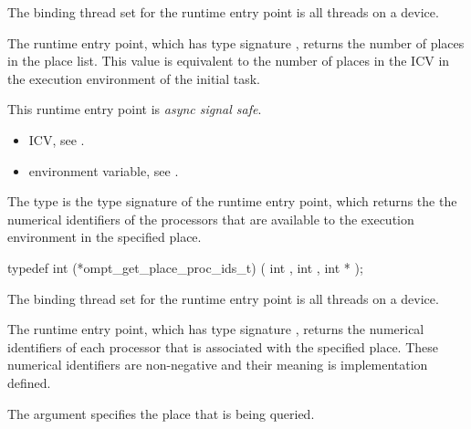 \binding
The binding thread set for the  runtime entry 
point is all threads on a device.

\descr
The  runtime entry point, which has type signature 
, returns the number of places in the place list. 
This value is equivalent to the number of places in the  
ICV in the execution environment of the initial task.

This runtime entry point is \emph{async signal safe}.

\crossreferences
\begin{itemize}
\item {} ICV, see
.

\item {} environment variable, see
.
\end{itemize}




\label{sec:ompt_get_place_proc_ids_t}
\label{sec:ompt_get_place_proc_ids}

\summary
The  type is the type signature of the 
 runtime entry point, which returns the
the numerical identifiers of the processors that are available to the execution 
environment in the specified place.

\format
\begin{ccppspecific}
\begin{omptInquiry}
typedef int (*ompt_get_place_proc_ids_t) (
  int ,
  int ,
  int *
);
\end{omptInquiry}
\end{ccppspecific}

\binding
The binding thread set for the  runtime 
entry point is all threads on a device.

\descr
The  runtime entry point, which has type 
signature , returns the numerical 
identifiers of each processor that is associated with the specified 
place. These numerical identifiers are non-negative and their meaning 
is implementation defined.

\argdesc
The  argument specifies the place that is being queried.


